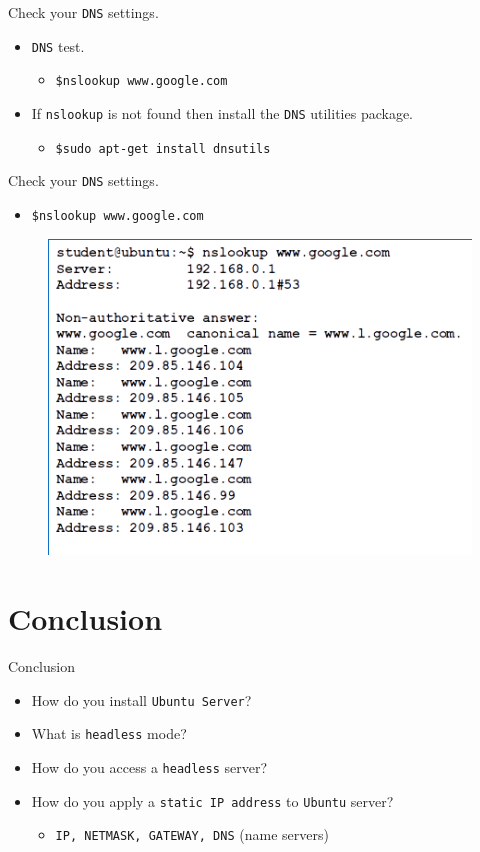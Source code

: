 \documentclass[aspectratio=169]{beamer}
\begin{document}
\begin{frame}{Check your \texttt{DNS} settings.}
  \begin{itemize}
    \item \texttt{DNS} test.
    \begin{itemize}
      \item \texttt{\$nslookup www.google.com}
    \end{itemize}
    \item If \texttt{nslookup} is not found then install the \texttt{DNS} utilities package.
    \begin{itemize}
      \item \texttt{\$sudo apt-get install dnsutils}
    \end{itemize}
  \end{itemize}
\end{frame}

\begin{frame}{Check your \texttt{DNS} settings.}
  \begin{itemize}
    \item \texttt{\$nslookup www.google.com}
  \end{itemize}
  \begin{figure}
    \begin{center}
      \includegraphics[width=0.5\linewidth]{nslookup.png}
    \end{center}
  \end{figure}
\end{frame}


\section*{Conclusion}
\begin{frame}{Conclusion}
  \begin{itemize}
    \item How do you install \texttt{Ubuntu Server}?
    \item What is \texttt{headless} mode?
    \item How do you access a \texttt{headless} server?
    \item How do you apply a \texttt{static IP address} to \texttt{Ubuntu} server?
    \begin{itemize}
      \item \texttt{IP, NETMASK, GATEWAY, DNS} (name servers)
    \end{itemize}
  \end{itemize}
\end{frame}
\end{document}
